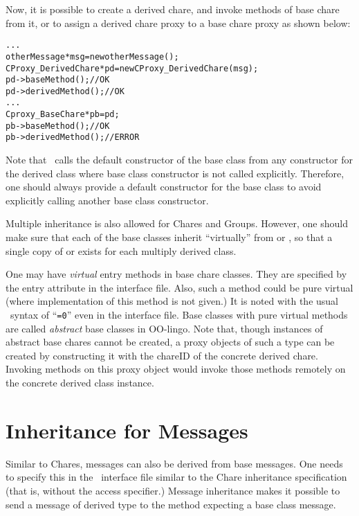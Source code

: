 Now, it is possible to create a derived chare, and invoke methods of base
chare from it, or to assign a derived chare proxy to a base chare proxy
as shown below:

\begin{alltt}
  ...
  otherMessage *msg = new otherMessage();
  CProxy_DerivedChare *pd = new CProxy_DerivedChare(msg);
  pd->baseMethod();     // OK
  pd->derivedMethod();  // OK
  ...
  Cproxy_BaseChare *pb = pd;
  pb->baseMethod();    // OK
  pb->derivedMethod(); // ERROR
\end{alltt}

Note that \CC\ calls the default constructor  of the
base class from any constructor for the derived class where base class
constructor is not called explicitly. Therefore, one should always provide a
default constructor for the base class to avoid explicitly calling another base
class constructor.

Multiple inheritance  is also allowed for Chares
and Groups. However, one should make sure that each of the base classes inherit
``virtually'' from  or , so that a single copy of
 or  exists for each multiply derived class.

One may have {\em virtual} entry methods  in base chare classes.
They are specified by the entry attribute  in the interface file.
Also, such a method could be pure virtual  (where
implementation of this method is not given.) It is noted with the usual \CC\
syntax of ``{\tt =0}'' even in the interface file. Base classes with pure
virtual methods are called {\em abstract} base classes \index{abstract base
class} in OO-lingo. Note that, though instances of abstract base chares cannot
be created, a proxy objects of such a type can be created by constructing it
with the chareID of the concrete derived chare. Invoking methods on this proxy
object would invoke those methods remotely on the concrete derived class
instance.

\section{Inheritance for Messages}

Similar to Chares, messages can also be derived from base messages. One needs
to specify this in the \charmpp\ interface file similar to the Chare
inheritance specification (that is, without the \kw{public} access specifier.)
Message inheritance makes it possible to send a message of derived type to the
method expecting a base class message.

